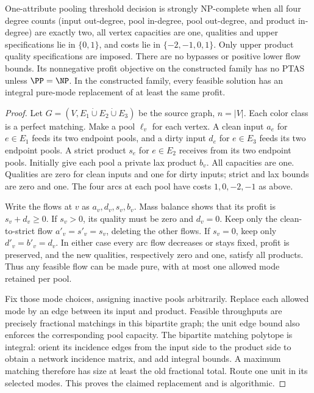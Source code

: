 \begin{theorem}\label{s3:all-two-thm}
One-attribute pooling threshold decision is strongly NP-complete when all
four degree counts (input out-degree, pool in-degree, pool out-degree,
and product in-degree)
are exactly two, all vertex capacities are one, qualities and upper
specifications lie in $\{0,1\}$, and costs lie in $\{-2,-1,0,1\}$.
Only upper product quality specifications are imposed. There are no
bypasses or positive lower flow bounds. Its nonnegative
profit objective on the constructed family has no PTAS unless
$\PP=\NP$. In the constructed family, every feasible solution has an integral
pure-mode replacement of at least the same profit.
\end{theorem}
\begin{proof}
Let $G=(V,E_1\mathbin{\dot\cup}E_2\mathbin{\dot\cup}E_3)$ be the
source graph, $n=|V|$. Each color class is a perfect matching. Make a
pool $\ell_v$ for each vertex. A clean input $a_e$ for $e\in E_1$
feeds its two endpoint pools, and a dirty input $d_e$ for $e\in E_3$
feeds its two endpoint pools. A strict product $s_e$ for $e\in E_2$
receives from its two endpoint pools. Initially give each pool a private
lax product $b_v$. All capacities are one. Qualities are zero for clean
inputs and one for dirty inputs; strict and lax bounds are zero and one.
The four arcs at each pool have costs $1,0,-2,-1$ as above.

Write the flows at $v$ as $a_v,d_v,s_v,b_v$. Mass balance shows that
its profit is $s_v+d_v\ge0$. If $s_v>0$, its quality must be zero and
$d_v=0$. Keep only the clean-to-strict flow
$a'_v=s'_v=s_v$, deleting the other flows. If $s_v=0$, keep only
$d'_v=b'_v=d_v$. In either case every arc flow decreases or stays fixed,
profit is preserved, and the new qualities, respectively zero and one,
satisfy all products. Thus any feasible flow can be made pure, with at
most one allowed mode retained per pool.

Fix those mode choices, assigning inactive pools arbitrarily. Replace
each allowed mode by an edge between its input and product. Feasible
throughputs are precisely fractional matchings in this bipartite graph;
the unit edge bound also enforces the corresponding pool capacity.
The bipartite matching polytope is integral: orient its incidence edges
from the input side to the product side to obtain a network incidence
matrix, and add integral bounds. A maximum matching therefore has size
at least the old fractional total. Route one unit in its selected modes.
This proves the claimed replacement and is algorithmic.


\end{proof}
